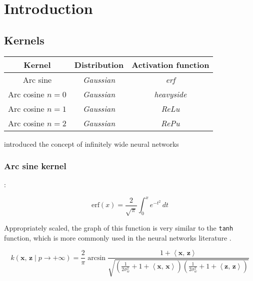 \section{Introduction}%
\label{sec:introduction}

\subsection{Kernels}
\label{sub:kernels}

\begin{table}[H]
    \begin{tabular}{ccc}
        \toprule
        \textbf{Kernel} & \textbf{Distribution} & \textbf{Activation function} \\
        \midrule
        Arc sine & \textit{Gaussian} & \textit{erf} \\
        Arc cosine $n=0$ & \textit{Gaussian} & \textit{heavyside} \\
        Arc cosine $n=1$ & \textit{Gaussian} & \textit{ReLu} \\
        Arc cosine $n=2$ & \textit{Gaussian} & \textit{RePu} \\
        \bottomrule
    \end{tabular}
\end{table}

\Textcite{williamsComputationInfiniteNeural1998} introduced the concept of
infinitely wide neural networks 

\textcite{nealBayesianLearningNeural1996}

\subsubsection{Arc sine kernel}

\textcite{frenayParameterinsensitiveKernelExtreme2011,williamsComputationInfiniteNeural1998}:

\begin{equation}\label{eq:erf}
    \text{erf}(x) = \frac{2}{\sqrt{\pi}} \int_0^x e^{-t^2} \,dt
\end{equation}

Appropriately scaled, the graph of this function is very similar to the \texttt{tanh} function,
which is more commonly used in the neural networks literature
\cite{williamsComputationInfiniteNeural1998}.

\newcommand{\x}{\mathbf{x}}
\newcommand{\z}{\mathbf{z}}
\newcommand{\y}{\mathbf{y}}

\begin{equation}\label{eq:kernel_asin}
	k(\x,\,\z \mid p \to + \infty)  = \frac{2}{\pi}
	\arcsin \frac{1 + \left\langle \x,\,\z \right\rangle}{\sqrt{
			\left(
			\frac{1}{2\sigma_w^2} + 1 + \left\langle \x,\,\x \right\rangle
			\right)
			\left(
			\frac{1}{2\sigma_w^2} + 1 + \left\langle \z,\,\z \right\rangle
			\right)
		}}
\end{equation}

